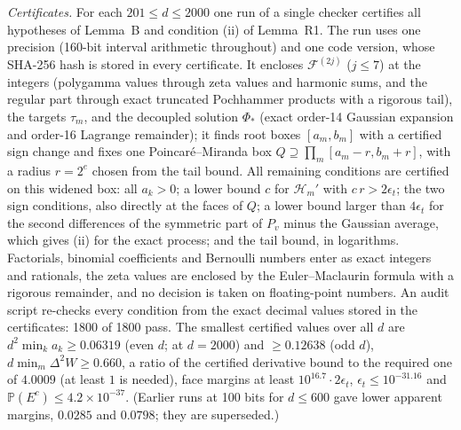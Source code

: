\documentclass[11pt]{amsart}
\theoremstyle{definition}
\theoremstyle{remark}
\numberwithin{equation}{section}
\begin{document}
\emph{Certificates.} For each $201\le d\le2000$ one run of a single checker certifies all hypotheses of Lemma~B and
condition (ii) of Lemma~R1. The run uses one precision (160-bit interval arithmetic throughout) and one code version,
whose SHA-256 hash is stored in every certificate. It encloses $\mathcal F^{(2j)}$ ($j\le7$) at the integers (polygamma
values through zeta values and harmonic sums, and the regular part through exact truncated Pochhammer products with a
rigorous tail), the targets $\tau_m$, and the decoupled solution $\Phi_*$ (exact order-14 Gaussian expansion and
order-16 Lagrange remainder); it finds root boxes $[a_m,b_m]$ with a certified sign change and fixes one
Poincar\'e--Miranda box $Q\supseteq\prod_m[a_m-r,b_m+r]$, with a radius $r=2^{e}$ chosen from the tail bound. All
remaining conditions are certified on this widened box: all $a_k>0$; a lower bound $c$ for $\mathcal H_m'$ with
$c\,r>2\epsilon_t$; the two sign conditions, also directly at the faces of $Q$; a lower bound larger than $4\epsilon_t$ for
the second differences of the symmetric part of $P_v$ minus the Gaussian average, which gives (ii) for the exact
process; and the tail bound, in logarithms. Factorials, binomial coefficients and Bernoulli numbers enter as
exact integers and rationals, the zeta values are enclosed by the Euler--Maclaurin formula with a rigorous remainder,
and no decision is taken on floating-point numbers. An audit script re-checks every condition from the exact decimal
values stored in the certificates: 1800 of 1800 pass. The smallest certified values over all $d$ are
$d^2\min_ka_k\ge0.06319$ (even $d$; at $d=2000$) and $\ge0.12638$ (odd $d$), $d\min_m\Delta^2W\ge0.660$, a ratio of the
certified derivative bound to the required one of $4.0009$ (at least $1$ is needed), face margins at least
$10^{16.7}\cdot2\epsilon_t$, $\epsilon_t\le10^{-31.16}$ and $\mathbb{P}(E^c)\le4.2\times10^{-37}$. (Earlier runs at
100 bits for $d\le600$ gave lower apparent margins, $0.0285$ and $0.0798$; they are superseded.)
\end{document}
